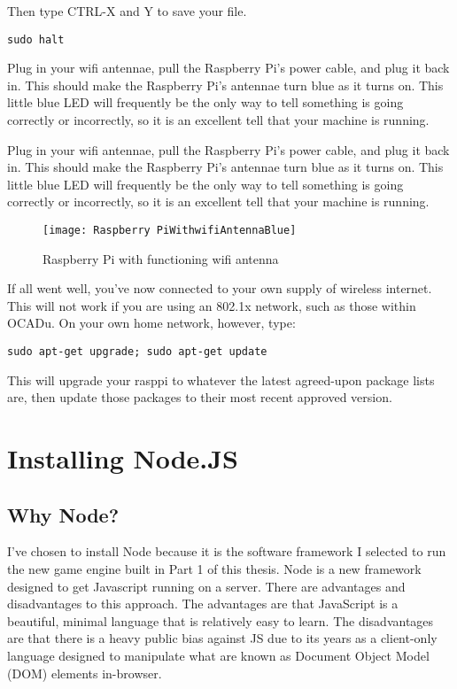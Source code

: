 Then type CTRL-X and Y to save your file.

\begin{lstlisting}
sudo halt
\end{lstlisting}

Plug in your wifi antennae, pull the Raspberry Pi's power cable, and plug it back in. This should make the Raspberry Pi's antennae turn blue as it turns on. This little blue LED will frequently be the only way to tell something is going correctly or incorrectly, so it is an excellent tell that your machine is running.

Plug in your wifi antennae, pull the Raspberry Pi's power cable, and plug it back in. This should make the Raspberry Pi's antennae turn blue as it turns on. This little blue LED will frequently be the only way to tell something is going correctly or incorrectly, so it is an excellent tell that your machine is running. 

\begin{figure}[left][h!][center]
\centering
\texttt{[image: Raspberry PiWithwifiAntennaBlue]}
\caption{Raspberry Pi with functioning wifi antenna}
\end{figure}

If all went well, you've now connected to your own supply of wireless internet. This will not work if you are using an 802.1x network, such as those within OCADu. On your own home network, however, type:

\begin{lstlisting}
sudo apt-get upgrade; sudo apt-get update
\end{lstlisting}

This will upgrade your rasppi to whatever the latest agreed-upon package lists are, then update those packages to their most recent approved version.

\section{Installing Node.JS}
\subsection{Why Node?}
I've chosen to install Node because it is the software framework I selected to run the new game engine built in Part 1 of this thesis. Node is a new framework designed to get Javascript running on a server. There are advantages and disadvantages to this approach. The advantages are that JavaScript is a beautiful, minimal language that is relatively easy to learn. The disadvantages are that there is a heavy public bias against JS due to its years as a client-only language designed to manipulate what are known as Document Object Model (DOM) elements in-browser.

